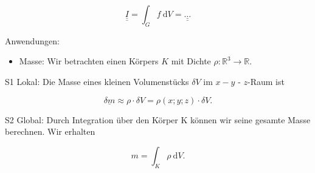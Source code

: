 \documentclass[10pt]{article}
\begin{document}
\begin{equation*}
\underline{\underline{I}}=\int_{G} f \mathrm{~d} V=\underline{\underline{\ldots}} \tag{2.93}
\end{equation*}


Anwendungen:

\begin{itemize}
  \item Masse: Wir betrachten einen Körpers $K$ mit Dichte $\rho: \mathbb{R}^{3} \rightarrow \mathbb{R}$.
\end{itemize}

S1 Lokal: Die Masse eines kleinen Volumenstücks $\delta V$ im $x-y$ - $z$-Raum ist


\begin{equation*}
\underline{\delta m} \approx \rho \cdot \delta V=\rho(x ; y ; z) \cdot \delta V . \tag{2.94}
\end{equation*}


S2 Global: Durch Integration über den Körper K können wir seine gesamte Masse berechnen. Wir erhalten


\begin{equation*}
m=\int_{K} \rho \mathrm{~d} V . \tag{2.95}
\end{equation*}
\end{document}
